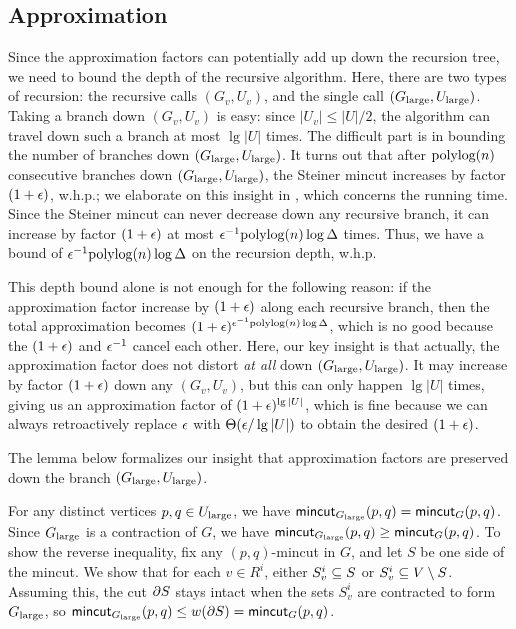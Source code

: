 
\subsection{Approximation}

Since the approximation factors can potentially add up down the recursion tree, we need to bound the depth of the recursive algorithm. Here, there are two types of recursion: the recursive calls $(G_v,U_v)$, and the single call $(G_{\textup{large}},U_{\textup{large}})$.  Taking a branch down $(G_v,U_v)$ is easy: since $|U_v|\le|U|/2$, the algorithm can travel down such a branch at most $\lg|U|$ times. The difficult part is in bounding the number of branches down $(G_{\textup{large}},U_{\textup{large}})$. It turns out that after $\textup{polylog}(n)$ consecutive branches down $(G_{\textup{large}},U_{\textup{large}})$, the Steiner mincut increases by factor $(1+\epsilon)$, w.h.p.; we elaborate on this insight in , which concerns the running time. Since the Steiner mincut can never decrease down any recursive branch, it can increase by factor $(1+\epsilon)$ at most $\epsilon^{-1}\textup{polylog}(n)\log\Delta$ times. Thus, we have a bound of $\epsilon^{-1}\textup{polylog}(n)\log\Delta$ on the recursion depth, w.h.p.

This depth bound alone is not enough for the following reason: if the approximation factor increase by $(1+\epsilon)$ along each recursive branch, then the total approximation becomes $(1+\epsilon)^{\epsilon^{-1}\textup{polylog}(n)\log\Delta}$, which is no good because the $(1+\epsilon)$ and $\epsilon^{-1}$ cancel each other. Here, our key insight is that actually, the approximation factor does not distort \emph{at all} down $(G_{\textup{large}},U_{\textup{large}})$. It may increase by factor $(1+\epsilon)$ down any $(G_v,U_v)$, but this can only happen $\lg|U|$ times, giving us an approximation factor of $(1+\epsilon)^{\lg|U|}$, which is fine because we can always retroactively replace $\epsilon$ with $\Theta(\epsilon/\lg|U|)$ to obtain the desired $(1+\epsilon)$.

The lemma below formalizes our insight that approximation factors are preserved down the branch $(G_{\textup{large}},U_{\textup{large}})$.

\BL{}
For any distinct vertices $p,q\in U_{\textup{large}}$, we have $\textsf{\textup{mincut}}_{G_{\textup{large}}}(p,q) = \textsf{\textup{mincut}}_G(p,q)$.
\EL
\BP
Since $G_{\textup{large}}$ is a contraction of $G$, we have $\textsf{\textup{mincut}}_{G_{\textup{large}}}(p,q) \ge \textsf{\textup{mincut}}_G(p,q)$. To show the reverse inequality, fix any $(p,q)$-mincut in $G$, and let $S$ be one side of the mincut. We show that for each $v\in  R^i$, either $S^i_v\subseteq S$ or $S^i_v\subseteq V\setminus S$. Assuming this, the cut $\partial S$ stays intact when the sets $S^i_v$ are contracted to form $G_{\textup{large}}$, so $\textsf{\textup{mincut}}_{G_{\textup{large}}}(p,q) \le w(\partial S) = \textsf{\textup{mincut}}_G(p,q)$.

